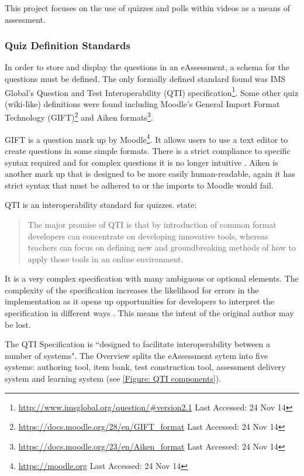 This project focuses on the use of quizzes and polls within videos as a means of assessment.

\subsubsection{Quiz Definition Standards}
\label{Subsubsection:Quiz Definition Standards}
In order to store and display the questions in an eAssessment, a schema for the questions must be defined. The only formally defined standard found was IMS Global's Question and Test Interoperability (QTI) specification\footnote{\url{http://www.imsglobal.org/question/\#version2.1} Last Accessed: 24 Nov 14}. Some other quiz (wiki-like) definitions were found including Moodle's General Import Format Technology (GIFT)\footnote{\url{https://docs.moodle.org/28/en/GIFT_format} Last Accessed: 24 Nov 14} and Aiken formats\footnote{\url{https://docs.moodle.org/23/en/Aiken_format} Last Accessed: 24 Nov 14}.

GIFT is a question mark up by Moodle\footnote{\url{https://moodle.org} Last Accessed: 24 Nov 14}. It allows users to use a text editor to create questions in some simple formats. There is a strict compliance to specific syntax required and for complex questions it is no longer intuitive \citep{failQTI}. Aiken is another mark up that is designed to be more easily human-readable, again it has strict syntax that must be adhered to or the imports to Moodle would fail.

QTI is an interoperability standard for quizzes. \cite{wikieassessment} state:
\begin{quote}
The major promise of QTI is that by introduction of common format developers can concentrate on developing innovative tools, whereas teachers can focus on defining new and groundbreaking methods of how to apply those tools in an online environment.
\end{quote}
It is a very complex specification with many ambiguous or optional elements. The complexity of the specification increases the likelihood for errors in the implementation as it opens up opportunities for developers to interpret the specification in different ways \citep{failQTI}. This means the intent of the original author may be lost.

The QTI Specification is ``designed to facilitate interoperability between a number of systems". The Overview \citep{qtiOverview} splits the eAssessment sytem into five systems: authoring tool, item bank, test construction tool, assessment delivery system and learning system (see \autoref{Figure: QTI components}). 

